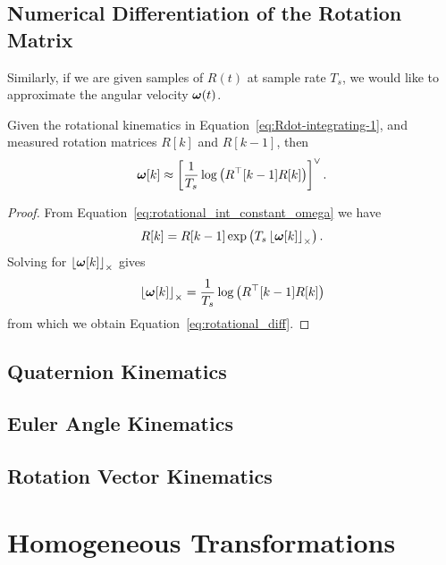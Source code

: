 \subsection{Numerical Differentiation of the Rotation Matrix}
\label{sec:numerical_differentiation_of_R}
Similarly, if we are given samples of $R(t)$ at sample rate $T_s$, we would like to approximate the angular velocity $\boldsymbol{\omega}(t)$.   
\begin{lemma}
Given the rotational kinematics in Equation~\eqref{eq:Rdot-integrating-1}, and measured rotation matrices $R[k]$ and $R[k-1]$, then
\begin{equation}\label{eq:rotational_diff}
\omegabf[k]\approx \left[\frac{1}{T_s}\log\left(R^\top[k-1]R[k]\right)\right]^{\vee}.
\end{equation}
\end{lemma}
\begin{proof}
From Equation~\eqref{eq:rotational_int_constant_omega} we have
\[
R[k] = R[k-1]\exp\left(T_s\left\lfloor\boldsymbol{\omega}[k]\right\rfloor_{\times}\right).
\]
Solving for $\left\lfloor\boldsymbol{\omega}[k]\right\rfloor_{\times}$ gives
\[
\left\lfloor\boldsymbol{\omega}[k]\right\rfloor_{\times} = \frac{1}{T_s}\log\left(R^\top[k-1]R[k]\right)
\]
from which we obtain Equation~\eqref{eq:rotational_diff}.
\end{proof}



\subsection{Quaternion Kinematics}

\subsection{Euler Angle Kinematics}

\subsection{Rotation Vector Kinematics}

\section{Homogeneous Transformations}
\label{sec:homogeneous transformations}

